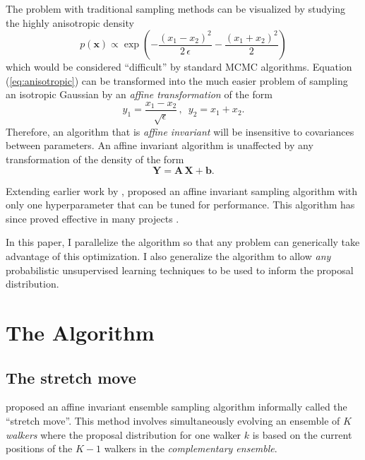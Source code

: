 \documentclass[12pt,preprint]{aastex}
\newcommand{\Eq}[1]{Equation (\ref{eq:#1})}
\newcommand{\eqlabel}[1]{\label{eq:#1}}
\begin{document}
The problem with traditional sampling methods can be visualized by studying the
highly anisotropic density
\begin{equation}
    \eqlabel{anisotropic}
    p(\mathbf{x}) \propto \exp \left (-\frac{(x_1-x_2)^2}{2\,\epsilon} - \frac{(x_1+x_2)^2}{2} \right )
\end{equation}
which would be considered ``difficult'' by standard MCMC algorithms. \Eq{anisotropic}
can be transformed into the much easier problem of sampling an isotropic Gaussian
by an \emph{affine transformation} of the form
\begin{equation}
    y_1 = \frac{x_1-x_2}{\sqrt{\epsilon}} \, , \,\,\, y_2 = x_1 + x_2.
\end{equation}
Therefore, an algorithm that is \emph{affine invariant} will be insensitive to
covariances between parameters. An affine invariant algorithm is unaffected by
any transformation of the density of the form
\begin{equation}
    \mathbf{Y} = \mathbf{A}\, \mathbf{X} + \mathbf{b}.
\end{equation}

Extending earlier work by \citet{Christen:2007},
\citet{Goodman:2010} proposed an affine invariant sampling algorithm with only
one hyperparameter that can be tuned for performance. This algorithm has since
proved effective in many projects
\citep[e.g.][Foreman-Mackey \& Widrow~2012, in prep.]{Hou:2011, Lang:2011}.

In this paper, I parallelize the algorithm so that any problem can generically
take advantage of this optimization. I also generalize the algorithm to allow
\emph{any} probabilistic unsupervised learning techniques to be used to inform
the proposal distribution.

\section{The Algorithm}

\subsection{The stretch move}

\citet{Goodman:2010} proposed an affine invariant ensemble sampling algorithm
informally called the ``stretch move''. This method involves simultaneously
evolving an ensemble of $K$ \emph{walkers} where the proposal distribution for one
walker $k$ is based on the current positions of the $K-1$ walkers in the
\emph{complementary ensemble}.
\end{document}
